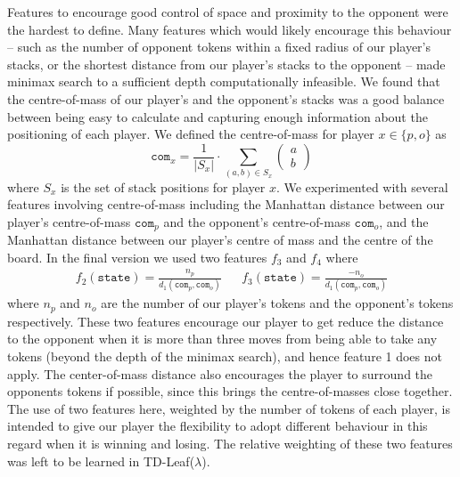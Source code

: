 \documentclass[11pt]{article}
\begin{document}
Features to encourage good control of space and proximity to the opponent were the hardest to define. Many features which would likely encourage this behaviour -- such as the number of opponent tokens within a fixed radius of our player's stacks, or the shortest distance from our player's stacks to the opponent -- made minimax search to a sufficient depth computationally infeasible. We found that the centre-of-mass of our player's and the opponent's stacks was a good balance between being easy to calculate and capturing enough information about the positioning of each player. We defined the centre-of-mass for player $x \in \{p, o\}$ as 
\[
    \texttt{com}_x = \frac{1}{|S_x|} \cdot \sum _{(a, b) \in S_x} \begin{pmatrix}
        a \\ b
    \end{pmatrix}
\]
where $S_x$ is the set of stack positions for player $x$. We experimented with several features involving centre-of-mass including the Manhattan distance between our player's centre-of-mass $\texttt{com}_p$ and the opponent's centre-of-mass $\texttt{com}_o$, and the Manhattan distance between our player's centre of mass and the centre of the board. In the final version we used two features $f_3$ and $f_4$ where
\begin{align*}
    f_2(\texttt{state}) = \frac{n_p}{d_1(\texttt{com}_p, \texttt{com}_o)} && f_3(\texttt{state}) = \frac{-n_o}{d_1(\texttt{com}_p, \texttt{com}_o)}
\end{align*}
where $n_p$ and $n_o$ are the number of our player's tokens and the opponent's tokens respectively. These two features encourage our player to get reduce the distance to the opponent when it is more than three moves from being able to take any tokens (beyond the depth of the minimax search), and hence feature 1 does not apply. The center-of-mass distance also encourages the player to surround the opponents tokens if possible, since this brings the centre-of-masses close together. The use of two features here, weighted by the number of tokens of each player, is intended to give our player the flexibility to adopt different behaviour in this regard when it is winning and losing. The relative weighting of these two features was left to be learned in TD-Leaf($\lambda$).
\end{document}
